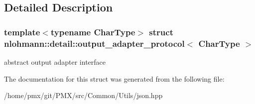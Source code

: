 \subsection{Detailed Description}
\subsubsection*{template$<$typename Char\+Type$>$\newline
struct nlohmann\+::detail\+::output\+\_\+adapter\+\_\+protocol$<$ Char\+Type $>$}

abstract output adapter interface 

The documentation for this struct was generated from the following file\+:\begin{DoxyCompactItemize}
\item 
/home/pmx/git/\+P\+M\+X/src/\+Common/\+Utils/json.\+hpp\end{DoxyCompactItemize}
